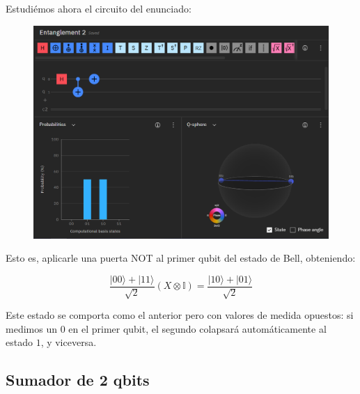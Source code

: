 \documentclass[11pt]{article}
\newcommand{\I}{\mathbb{I}}
\newcommand{\ra}{\rangle}
\newcounter{enunciado}
\begin{document}
Estudiémos ahora el circuito del enunciado:

\begin{figure}[H]
	\centering
	\includegraphics[scale=0.6]{figures/entanglement2.png}
\end{figure}

Esto es, aplicarle una puerta NOT al primer qubit del estado de Bell, obteniendo:

\[
	\frac{|00\ra + |11\ra}{\sqrt 2} (X \otimes \I) = \frac{|10\ra + |01\ra}{\sqrt 2}
\]

Este estado se comporta como el anterior pero con valores de medida opuestos: si medimos un $0$ en el primer qubit, el segundo colapsará automáticamente al estado $1$, y viceversa.


\subsection{Sumador de 2 qbits}
\end{document}
